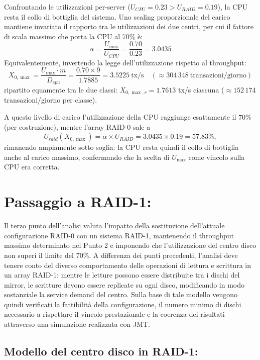 \documentclass[11pt,a4paper]{article}
\begin{document}
Confrontando le utilizzazioni per-server ($U_{CPU}=0.23 > U_{RAID}=0.19$), la CPU resta il collo
di bottiglia del sistema. Uno scaling proporzionale del carico mantiene invariato il rapporto tra le
utilizzazioni dei due centri, per cui il fattore di scala massimo che porta la CPU al 70\% è:
\begin{equation}
\alpha = \frac{U_{\max}}{U_{CPU}} = \frac{0.70}{0.23} = 3.0435
\end{equation}
Equivalentemente, invertendo la legge dell'utilizzazione rispetto al throughput:
\begin{equation}
X_{0,\max} = \frac{U_{\max}\cdot m}{D_{cpu}} = \frac{0.70\times 9}{1.7885} = 3.5225\ \text{tx/s}
\quad (\approx 304\,348\ \text{transazioni/giorno})
\end{equation}
ripartito equamente tra le due classi: $X_{0,\max,r} = 1.7613$ tx/s ciascuna
($\approx 152\,174$ transazioni/giorno per classe).

A questo livello di carico l'utilizzazione della CPU raggiunge esattamente il 70\% (per
costruzione), mentre l'array RAID-0 sale a
\begin{equation}
U_{raid}(X_{0,\max}) = \alpha \times U_{RAID} = 3.0435\times 0.19 = 57.83\%,
\end{equation}
rimanendo ampiamente sotto soglia: la CPU resta quindi il collo di bottiglia anche al carico
massimo, confermando che la scelta di $U_{\max}$ come vincolo sulla CPU era corretta.

\section{Passaggio a RAID-1:}
Il terzo punto dell'analisi valuta l'impatto della sostituzione dell'attuale configurazione RAID-0 con un sistema RAID-1, mantenendo il throughput massimo determinato nel Punto 2 e imponendo che l'utilizzazione del centro disco non superi il limite del 70\%. A differenza dei punti precedenti, l'analisi deve tenere conto del diverso comportamento delle operazioni di lettura e scrittura in un array RAID-1: mentre le letture possono essere distribuite tra i dischi del mirror, le scritture devono essere replicate su ogni disco, modificando in modo sostanziale la service demand del centro. Sulla base di tale modello vengono quindi verificati la fattibilità della configurazione, il numero minimo di dischi necessario a rispettare il vincolo prestazionale e la coerenza dei risultati attraverso una simulazione realizzata con JMT.
\subsection{Modello del centro disco in RAID-1:}
\end{document}
